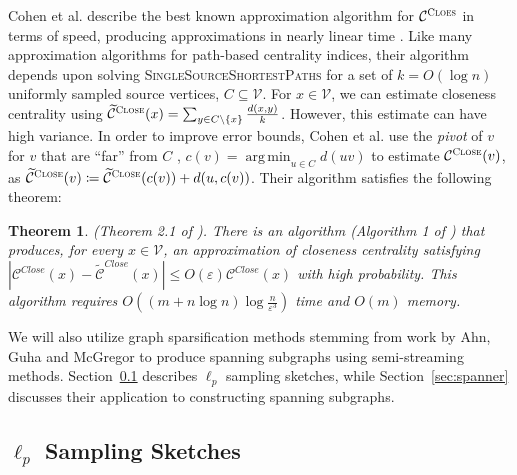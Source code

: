 \documentclass[10]{report}
\newtheorem{theorem}{Theorem}[section]
\DeclareMathOperator*{\argmin}{arg\,min}
\newcommand{\algoname}[1]{\textnormal{\textsc{#1}}}
\begin{document}
Cohen et al. describe the best known approximation algorithm for $\mathcal{C}^{\algoname{Cloes}}$ in terms of speed, producing approximations in  nearly linear time \cite{cohen2014computing}. 
Like many approximation algorithms for path-based centrality indices, their algorithm depends upon solving \algoname{SingleSourceShortestPaths} for a set of $k = O(\log n)$ uniformly sampled source vertices, $C \subseteq \mathcal{V}$.
For $x \in \mathcal{V}$, we can estimate closeness centrality using $\widetilde{\mathcal{C}}^{\algoname{Close}}(x) = \sum_{y \in C \setminus \{x \}} \frac{d(x,y)}{k}$.
However, this estimate can have high variance.
In order to improve error bounds, Cohen et al. use the \emph{pivot} of $v$ for $v$ that are ``far'' from $C$ , $c(v) = \argmin_{u \in C} d(uv)$ to estimate $\mathcal{C}^{\algoname{Close}}(v)$, as $\widetilde{\mathcal{C}}^{\algoname{Close}}(v) \coloneqq \widetilde{\mathcal{C}}^{\algoname{Close}}(c(v)) + d(u, c(v))$. 
Their algorithm satisfies the following theorem:
%
\begin{theorem}{(Theorem 2.1 of \cite{cohen2014computing}).} \label{thm:cc:approx}
There is an algorithm (Algorithm 1 of \cite{cohen2014computing}) that produces, for every $x \in \mathcal{V}$, an approximation of closeness centrality satisfying $|\mathcal{C}^{Close}(x) - \widetilde{\mathcal{C}}^{Close}(x)| \leq O(\varepsilon) \mathcal{C}^{Close}(x)$ with high probability.
This algorithm requires $O((m + n \log n) \log \frac{n}{\varepsilon^{3}})$ time and $O(m)$ memory.
\end{theorem}


We will also utilize graph sparsification methods stemming from work by Ahn, Guha and McGregor to produce spanning subgraphs using semi-streaming methods.
Section~\ref{sec:lp-sample} describes $\ell_p$ sampling sketches, while Section~\ref{sec:spanner} discusses their application to constructing spanning subgraphs.


\subsection{$\ell_p$ Sampling Sketches} \label{sec:lp-sample}
\end{document}
